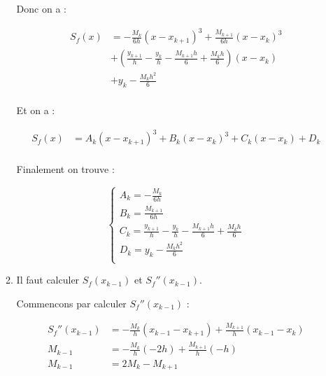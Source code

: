 \documentclass[12pt, letterpaper]{article}
\begin{document}
\begin{enumerate}
\begin{enumerate}
    Donc on a :

    \begin{equation*}
      \begin{split}
        S_f(x) & = - \frac{M_k}{6h} (x - x_{k + 1})^3 + 
        \frac{M_{k + 1}}{6h} (x - x_k)^3 \\
        & + \left( \frac{y_{k + 1}}{h} - \frac{y_k}{h} - \frac{M_{k
            + 1} h}{6} + \frac{M_k h}{6} \right) (x - x_k) \\
        & + y_k - \frac{M_k h^2}{6} \\
      \end{split}
    \end{equation*}

    Et on a :
    
    \begin{equation*}
      \begin{split}
        S_f(x) & = A_k (x - x_{k + 1})^3 + B_k (x - x_k)^3 + C_k (x -
        x_k) + D_k \\
      \end{split}
    \end{equation*}

    Finalement on trouve :

    \begin{equation*}
      \left\{
      \begin{array}{l}
        A_k = - \frac{M_k}{6h}\\
        B_k = \frac{M_{k + 1}}{6h}\\
        C_k = \frac{y_{k + 1}}{h} - \frac{y_k}{h} - \frac{M_{k
            + 1} h}{6} + \frac{M_k h}{6}\\
        D_k = y_k - \frac{M_k h^2}{6}\\
      \end{array}
      \right.
    \end{equation*}


  \item

    Il faut calculer $S_f(x_{k - 1})$ et $S_f''(x_{k -
      1})$. \newline

    Commencons par calculer $S_f''(x_{k - 1})$ :

    \begin{equation*}
      \begin{split}
        S_f''(x_{k - 1}) & = - \frac{M_k}{h} (x_{k - 1} - x_{k + 1}) + 
        \frac{M_{k + 1}}{h} (x_{k - 1} - x_k)\\
        M_{k - 1} & = - \frac{M_k}{h} (-2h) + 
        \frac{M_{k + 1}}{h} (-h)\\
        M_{k - 1} & = 2 M_k - M_{k + 1} \\
      \end{split}
    \end{equation*}


\end{enumerate}
\end{enumerate}
\end{document}

